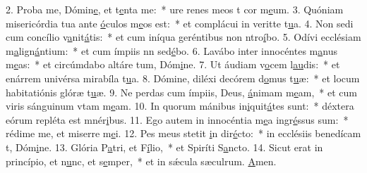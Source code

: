 2. Proba me, Dómin\uline{e}, et t\uline{e}nta me:~* ure renes meos t cor m\uline{e}um.
3. Quóniam misericórdia tua ante \uline{ó}culos m\uline{e}os est:~* et complácui in veritte t\uline{u}a.
4. Non sedi cum concílio v\uline{a}nit\uline{á}tis:~* et cum iníqua geréntibus non ntro\uline{í}bo.
5. Odívi ecclésiam m\uline{a}lign\uline{á}ntium:~* et cum ímpiis nn sed\uline{é}bo.
6. Lavábo inter innocéntes m\uline{a}nus m\uline{e}as:~* et circúmdabo altáre tum, Dóm\uline{i}ne.
7. Ut áudiam v\uline{o}cem l\uline{au}dis:~* et enárrem univérsa mirabíla t\uline{u}a.
8. Dómine, diléxi decórem d\uline{o}mus t\uline{u}æ:~* et locum habitatiónis glóræ t\uline{u}æ.
9. Ne perdas cum ímpiis, Deus, \uline{á}nimam m\uline{e}am,~* et cum viris sánguinum vtam m\uline{e}am.
10. In quorum mánibus in\uline{i}quit\uline{á}tes sunt:~* déxtera eórum repléta est mnér\uline{i}bus.
11. Ego autem in innocéntia m\uline{e}a ingr\uline{é}ssus sum:~* rédime me, et miserre m\uline{e}i.
12. Pes meus stetit \uline{i}n dir\uline{é}cto:~* in ecclésiis benedícam t, Dóm\uline{i}ne.
13. Glória P\uline{a}tri, et F\uline{í}lio,~* et Spiríti S\uline{a}ncto.
14. Sicut erat in princípio, et n\uline{u}nc, et s\uline{e}mper,~* et in sǽcula sæculrum. \uline{A}men.
